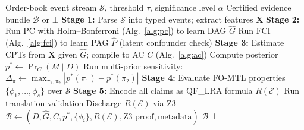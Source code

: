 \documentclass[11pt]{article}
\DeclareMathOperator{\Pr}{Pr}
\begin{document}
\begin{algorithm}[h]
\caption{VMEE Evidence Bundle Generation}
\label{alg:vmee}
\begin{algorithmic}[1]
\Require Order-book event stream $\mathcal{S}$, threshold $\tau$, significance level $\alpha$
\Ensure Certified evidence bundle $\mathcal{B}$ or $\bot$
\State \textbf{Stage 1:} Parse $\mathcal{S}$ into typed events; extract features $\mathbf{X}$
\State \textbf{Stage 2:} Run PC with Holm--Bonferroni (Alg.~\ref{alg:pc}) to learn DAG $\hat{G}$
\State \hspace{2em} Run FCI (Alg.~\ref{alg:fci}) to learn PAG $\hat{P}$ (latent confounder check)
\State \textbf{Stage 3:} Estimate CPTs from $\mathbf{X}$ given $\hat{G}$; compile to AC $C$ (Alg.~\ref{alg:ac})
\State \hspace{2em} Compute posterior $p^* \gets \Pr_C(M \mid D)$
\State \hspace{2em} Run multi-prior sensitivity: $\Delta_\pi \gets \max_{\pi_1, \pi_2} |p^*(\pi_1) - p^*(\pi_2)|$
\State \textbf{Stage 4:} Evaluate FO-MTL properties $\{\phi_1, \ldots, \phi_s\}$ over $\mathcal{S}$
\State \textbf{Stage 5:} Encode all claims as QF\_LRA formula $R(\mathcal{E})$
\State \hspace{2em} Run translation validation
\State \hspace{2em} Discharge $R(\mathcal{E})$ via Z3
  \State $\mathcal{B} \gets (D, \hat{G}, C, p^*, \{\phi_i\}, R(\mathcal{E}), \text{Z3 proof}, \text{metadata})$
  \State \Return $\mathcal{B}$
\Else
  \State \Return $\bot$ 
\EndIf
\end{algorithmic}
\end{algorithm}
\end{document}
